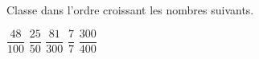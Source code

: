 %
%
  Classe dans l'ordre croissant les nombres suivants.
  \begin{center}
    $\dfrac{48}{100}$\hfil
    $\dfrac{25}{50}$\hfil
    $\dfrac{81}{300}$\hfil
    $\dfrac{7}{7}$\hfil
    $\dfrac{300}{400}$
  \end{center}
